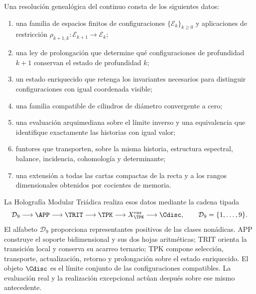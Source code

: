 \begin{definition}
Una resoluci\'on geneal\'ogica del continuo consta de los siguientes datos:
\begin{enumerate}[label=\textup{(\roman*)}]
 \item una familia de espacios finitos de configuraciones
       \(\{\mathcal E_k\}_{k\geq0}\) y aplicaciones de restricci\'on
       \(\rho_{k+1,k}:\mathcal E_{k+1}\to\mathcal E_k\);
 \item una ley de prolongaci\'on que determine qu\'e configuraciones de
       profundidad \(k+1\) conservan el estado de profundidad \(k\);
 \item un estado enriquecido que retenga los invariantes necesarios para
       distinguir configuraciones con igual coordenada visible;
 \item una familia compatible de cilindros de di\'ametro convergente a cero;
 \item una evaluaci\'on arquimediana sobre el l\'imite inverso y una
       equivalencia que identifique exactamente las historias con igual
       valor;
 \item funtores que transporten, sobre la misma historia, estructura
       espectral, balance, incidencia, cohomolog\'ia y determinante;
 \item una extensi\'on a todas las cartas compactas de la recta y a los
       rangos dimensionales obtenidos por cocientes de memoria.
\end{enumerate}
\end{definition}

La Holograf\'ia Modular Tri\'adica realiza esos datos mediante la cadena
tipada
\begin{equation}
 \mathcal D_9
 \longrightarrow \APP
 \longrightarrow \TRIT
 \longrightarrow \TPK
 \longrightarrow X_{\TPK}^{\rm enr}
 \longrightarrow \Cdisc,
 \qquad \mathcal D_9=\{1,\ldots,9\}.
 \label{eq:cadena-rectora-formulacion}
\end{equation}
El alfabeto \(\mathcal D_9\) proporciona representantes positivos de las
clases non\'adicas. APP construye el soporte bidimensional y sus dos hojas
aritm\'eticas; TRIT orienta la transici\'on local y conserva su acarreo
ternario; TPK compone selecci\'on, transporte, actualizaci\'on, retorno y
prolongaci\'on sobre el estado enriquecido. El objeto \(\Cdisc\) es el
l\'imite conjunto de las configuraciones compatibles. La evaluaci\'on real y
la realizaci\'on excepcional act\'uan despu\'es sobre ese mismo antecedente.

